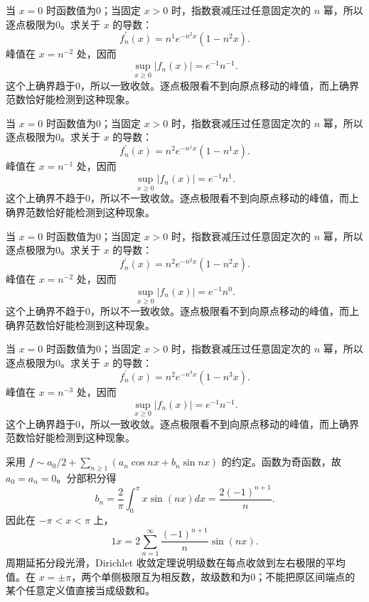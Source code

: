 \documentclass[12pt,fontset=fandol]{ctexart}
\begin{document}
\begin{solve}\label{ans:c28q9}
当 $x=0$ 时函数值为0；当固定 $x>0$ 时，指数衰减压过任意固定次的 $n$ 幂，所以逐点极限为0。求关于 $x$ 的导数：
\[
f_n^{\prime}(x)=n^{1}e^{-n^{2}x}(1-n^{2}x).
\]
峰值在 $x=n^{-2}$ 处，因而
\[
\sup_{x\ge0}|f_n(x)|=e^{-1}n^{-1}.
\]
这个上确界趋于0，所以一致收敛。逐点极限看不到向原点移动的峰值，而上确界范数恰好能检测到这种现象。
\end{solve}

\begin{solve}\label{ans:c28q10}
当 $x=0$ 时函数值为0；当固定 $x>0$ 时，指数衰减压过任意固定次的 $n$ 幂，所以逐点极限为0。求关于 $x$ 的导数：
\[
f_n^{\prime}(x)=n^{2}e^{-n^{1}x}(1-n^{1}x).
\]
峰值在 $x=n^{-1}$ 处，因而
\[
\sup_{x\ge0}|f_n(x)|=e^{-1}n^{1}.
\]
这个上确界不趋于0，所以不一致收敛。逐点极限看不到向原点移动的峰值，而上确界范数恰好能检测到这种现象。
\end{solve}

\begin{solve}\label{ans:c28q11}
当 $x=0$ 时函数值为0；当固定 $x>0$ 时，指数衰减压过任意固定次的 $n$ 幂，所以逐点极限为0。求关于 $x$ 的导数：
\[
f_n^{\prime}(x)=n^{2}e^{-n^{2}x}(1-n^{2}x).
\]
峰值在 $x=n^{-2}$ 处，因而
\[
\sup_{x\ge0}|f_n(x)|=e^{-1}n^{0}.
\]
这个上确界不趋于0，所以不一致收敛。逐点极限看不到向原点移动的峰值，而上确界范数恰好能检测到这种现象。
\end{solve}

\begin{solve}\label{ans:c28q12}
当 $x=0$ 时函数值为0；当固定 $x>0$ 时，指数衰减压过任意固定次的 $n$ 幂，所以逐点极限为0。求关于 $x$ 的导数：
\[
f_n^{\prime}(x)=n^{2}e^{-n^{3}x}(1-n^{3}x).
\]
峰值在 $x=n^{-3}$ 处，因而
\[
\sup_{x\ge0}|f_n(x)|=e^{-1}n^{-1}.
\]
这个上确界趋于0，所以一致收敛。逐点极限看不到向原点移动的峰值，而上确界范数恰好能检测到这种现象。
\end{solve}

\begin{solve}\label{ans:c28q13}
采用 $f\sim a_0/2+\sum_{n\ge1}(a_n\cos nx+b_n\sin nx)$ 的约定。函数为奇函数，故 $a_0=a_n=0$。分部积分得
\[
b_n=\frac{2}\pi\int_0^\pi x\sin(nx)dx=\frac{2(-1)^{n+1}}n.
\]
因此在 $-\pi<x<\pi$ 上，
\[
1x=2\sum_{n=1}^\infty\frac{(-1)^{n+1}}n\sin(nx).
\]
周期延拓分段光滑，Dirichlet 收敛定理说明级数在每点收敛到左右极限的平均值。在 $x=\pm\pi$，两个单侧极限互为相反数，故级数和为0；不能把原区间端点的某个任意定义值直接当成级数和。
\end{solve}
\end{document}
